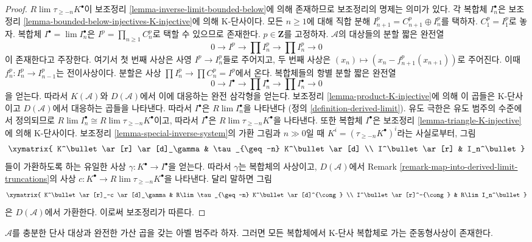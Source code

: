 \begin{proof}
$R\lim \tau_{\geq -n}K^\bullet$이 보조정리
\ref{lemma-inverse-limit-bounded-below}에 의해 존재하므로 보조정리의
명제는 의미가 있다. 각 복합체 $I_n^\bullet$은 보조정리
\ref{lemma-bounded-below-injectives-K-injective}에 의해 K-단사이다.
모든 $n \geq 1$에 대해 직합 분해
$I_{n + 1}^p = C_{n + 1}^p \oplus I_n^p$를 택하자.
$C_1^p = I_1^p$로 놓자. 복합체 $I^\bullet = \lim I_n^\bullet$은
$I^p = \prod_{n \geq 1} C_n^p$로 택할 수 있으므로 존재한다.
$p \in \mathbf{Z}$를 고정하자. $\mathcal{A}$의 대상들의 분할 짧은 완전열
$$
0 \to I^p \to \prod I_n^p \to \prod I_n^p \to 0
$$
이 존재한다고 주장한다. 여기서 첫 번째 사상은 사영
$I^p \to I_n^p$들로 주어지고, 두 번째 사상은
$(x_n) \mapsto (x_n - f^p_{n + 1}(x_{n + 1}))$로 주어진다. 이때
$f^p_n : I_n^p \to I_{n - 1}^p$는 전이사상이다. 분할은 사상
$\prod I_n^p \to \prod C_n^p = I^p$에서 온다.
복합체들의 항별 분할 짧은 완전열
$$
0 \to I^\bullet \to \prod I_n^\bullet \to \prod I_n^\bullet \to 0
$$
을 얻는다. 따라서 $K(\mathcal{A})$와 $D(\mathcal{A})$에서 이에
대응하는 완전 삼각형을 얻는다. 보조정리
\ref{lemma-product-K-injective}에 의해 이 곱들은 K-단사이고
$D(\mathcal{A})$에서 대응하는 곱들을 나타낸다. 따라서
$I^\bullet$은 $R\lim I_n^\bullet$을 나타낸다
(정의 \ref{definition-derived-limit}). 유도 극한은 유도 범주의
수준에서 정의되므로 $R\lim I_n^\bullet \cong R\lim \tau_{\geq -n}K^\bullet$이고,
따라서 $I^\bullet$은 $R\lim \tau_{\geq -n}K^\bullet$을 나타낸다.
또한 복합체 $I^\bullet$은 보조정리
\ref{lemma-triangle-K-injective}에 의해 K-단사이다.
보조정리 \ref{lemma-special-inverse-system}의 가환 그림과
$n \gg 0$일 때 $K^i = (\tau_{\geq -n}K^\bullet)^i$라는 사실로부터,
그림
$$
\xymatrix{
K^\bullet \ar[r] \ar[d]_\gamma & \tau_{\geq -n} K^\bullet \ar[d] \\
I^\bullet \ar[r] & I_n^\bullet
}
$$
들이 가환하도록 하는 유일한 사상 $\gamma : K^\bullet \to I^\bullet$을
얻는다. 따라서 $\gamma$는 복합체의 사상이고, $D(\mathcal{A})$에서
Remark \ref{remark-map-into-derived-limit-truncations}의 사상
$c : K^\bullet \to R\lim \tau_{\geq -n}K^\bullet$을 나타낸다.
달리 말하면 그림
$$
\xymatrix{
K^\bullet \ar[r]_-c \ar[d]_\gamma & R\lim \tau_{\geq -n} K^\bullet
\ar[d]^{\cong} \\
I^\bullet \ar[r]^-{\cong} & R\lim I_n^\bullet
}
$$
은 $D(\mathcal{A})$에서 가환한다. 이로써 보조정리가 따른다.
\end{proof}

\begin{lemma}
\label{lemma-enough-K-injectives-Ab4-star}
$\mathcal{A}$를 충분한 단사 대상과 완전한 가산 곱을 갖는 아벨 범주라 하자.
그러면 모든 복합체에서 K-단사 복합체로 가는 준동형사상이 존재한다.
\end{lemma}

